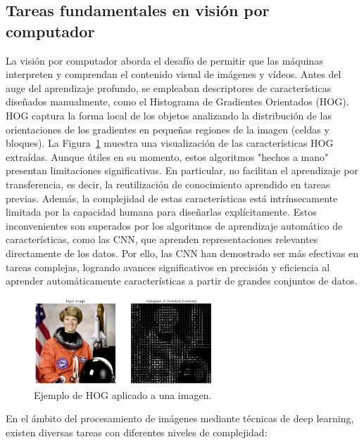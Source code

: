 \documentclass[11pt,spanish,listoffigures,listoftables]{tfgetsinf}
\begin{document}
\subsection{Tareas fundamentales en visión por computador}

La visión por computador aborda el desafío de permitir que las máquinas interpreten y comprendan el contenido visual de imágenes y vídeos. Antes del auge del aprendizaje profundo, se empleaban descriptores de características diseñados manualmente, como el Histograma de Gradientes Orientados (HOG). HOG captura la forma local de los objetos analizando la distribución de las orientaciones de los gradientes en pequeñas regiones de la imagen (celdas y bloques). La Figura~\ref{fig:hog} muestra una visualización de las características HOG extraídas. Aunque útiles en su momento, estos algoritmos "hechos a mano" presentan limitaciones significativas. En particular, no facilitan el aprendizaje por transferencia, es decir, la reutilización de conocimiento aprendido en tareas previas. Además, la complejidad de estas características está intrínsecamente limitada por la capacidad humana para diseñarlas explícitamente. Estos inconvenientes son superados por los algoritmos de aprendizaje automático de características, como las CNN, que aprenden representaciones relevantes directamente de los datos. Por ello, las CNN han demostrado ser más efectivas en tareas complejas, logrando avances significativos en precisión y eficiencia al aprender automáticamente características a partir de grandes conjuntos de datos.

\begin{figure}[H]
   \centering
   \includegraphics[width=0.6\textwidth]{images/estado_del_arte/HOG_example.png}
   \caption{Ejemplo de HOG aplicado a una imagen.}
   \label{fig:hog}
\end{figure}


En el ámbito del procesamiento de imágenes mediante técnicas de deep learning, existen diversas tareas con diferentes niveles de complejidad:
\end{document}
